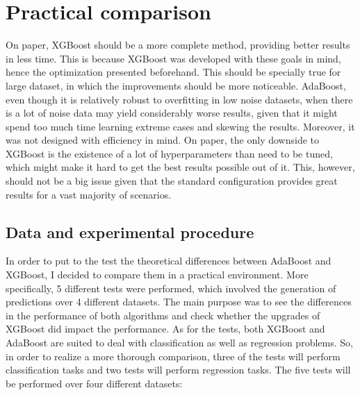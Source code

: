 \documentclass{article}
\begin{document}
\section{Practical comparison}
On paper, XGBoost should be a more complete method, providing better results in less time. This is because XGBoost was developed with these goals in mind, hence the optimization presented beforehand. This should be specially true for large dataset, in which the improvements should be more noticeable. AdaBoost, even though it is relatively robust to overfitting in low noise datasets, when there is a lot of noise data may yield considerably worse results, given that it might spend too much time learning extreme cases and skewing the results. Moreover, it was not designed with efficiency in mind. On paper, the only downside to XGBoost is the existence of a lot of hyperparameters than need to be tuned, which might make it hard to get the best results possible out of it. This, however, should not be a big issue given that the standard configuration provides great results for a vast majority of scenarios.
\subsection{Data and experimental procedure}

In order to put to the test the theoretical differences between AdaBoost and XGBoost, I decided to compare them in a practical environment. More specifically, 5 different tests were performed, which involved the generation of predictions over 4 different datasets. The main purpose was to see the differences in the performance of both algorithms and check whether the upgrades of XGBoost did impact the performance. As for the tests, both XGBoost and AdaBoost are suited to deal with classification as well as regression problems. So, in order to realize a more thorough comparison, three of the tests will perform classification tasks and two tests will perform regression tasks. The five tests will be performed over four different datasets:
\end{document}
